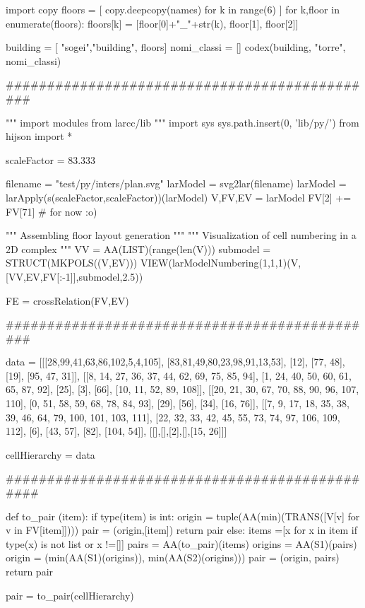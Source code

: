 import copy
floors = [ copy.deepcopy(names) for k in range(6) ]
for k,floor in enumerate(floors):
    floors[k] = [floor[0]+"_"+str(k), floor[1], floor[2]]

building = [ "sogei","building", floors]
nomi_classi = []
codex(building, "torre", nomi_classi)




##############################################



""" import modules from larcc/lib """
import sys
sys.path.insert(0, 'lib/py/')
from hijson import *

scaleFactor = 83.333

filename = "test/py/inters/plan.svg"
larModel = svg2lar(filename)
larModel = larApply(s(scaleFactor,scaleFactor))(larModel)
V,FV,EV = larModel
FV[2] += FV[71]      # for now :o)

""" Assembling floor layout generation """
""" Visualization of cell numbering in a 2D complex """
VV = AA(LIST)(range(len(V)))
submodel = STRUCT(MKPOLS((V,EV)))
VIEW(larModelNumbering(1,1,1)(V,[VV,EV,FV[:-1]],submodel,2.5))

FE = crossRelation(FV,EV)


##############################################


data = [[[28,99,41,63,86,102,5,4,105],
 [83,81,49,80,23,98,91,13,53],
 [12],
 [77, 48],
 [19],
 [95, 47, 31]],
[[8, 14, 27, 36, 37, 44, 62, 69, 75, 85, 94],
 [1, 24, 40, 50, 60, 61, 65, 87, 92],
 [25],
 [3],
 [66],
 [10, 11, 52, 89, 108]],
[[20, 21, 30, 67, 70, 88, 90, 96, 107, 110],
 [0, 51, 58, 59, 68, 78, 84, 93],
 [29],
 [56],
 [34],
 [16, 76]],
[[7, 9, 17, 18, 35, 38, 39, 46, 64, 79, 100, 101, 103, 111],
 [22, 32, 33, 42, 45, 55, 73, 74, 97, 106, 109, 112],
 [6],
 [43, 57],
 [82],
 [104, 54]],
[[],[],[2],[],[15, 26]]]


cellHierarchy = data 

###############################################



def to_pair (item):
  if type(item) is int:
    origin = tuple(AA(min)(TRANS([V[v] for v in FV[item]])))
    pair = (origin,[item])
    return pair
  else:
    items =[x for x in item if type(x) is not list or x !=[]]
    pairs = AA(to_pair)(items)
    origins = AA(S1)(pairs)
    origin = (min(AA(S1)(origins)), min(AA(S2)(origins)))
    pair = (origin, pairs)
    return pair
    
pair = to_pair(cellHierarchy)

